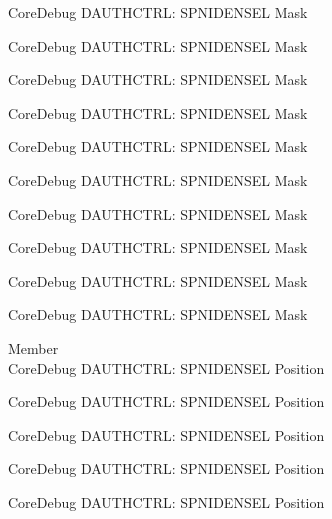 \begin{DoxyRefList}
\label{deprecated__deprecated000539}%
%
Core\+Debug DAUTHCTRL\+: SPNIDENSEL Mask 

\label{deprecated__deprecated000641}%
%
Core\+Debug DAUTHCTRL\+: SPNIDENSEL Mask 

\label{deprecated__deprecated000747}%
%
Core\+Debug DAUTHCTRL\+: SPNIDENSEL Mask 

\label{deprecated__deprecated000801}%
%
Core\+Debug DAUTHCTRL\+: SPNIDENSEL Mask 

\label{deprecated__deprecated000877}%
%
Core\+Debug DAUTHCTRL\+: SPNIDENSEL Mask 

\label{deprecated__deprecated000940}%
%
Core\+Debug DAUTHCTRL\+: SPNIDENSEL Mask 

\label{deprecated__deprecated001019}%
%
Core\+Debug DAUTHCTRL\+: SPNIDENSEL Mask 

\label{deprecated__deprecated001095}%
%
Core\+Debug DAUTHCTRL\+: SPNIDENSEL Mask 

\label{deprecated__deprecated001198}%
%
Core\+Debug DAUTHCTRL\+: SPNIDENSEL Mask 

\label{deprecated__deprecated001300}%
%
Core\+Debug DAUTHCTRL\+: SPNIDENSEL Mask  
\item[Member \doxylink{group___c_m_s_i_s___s_c_b_ga866734a8e4bec2d6cf091e265c6c0f3d}{Core\+Debug\+\_\+\+DAUTHCTRL\+\_\+\+SPNIDENSEL\+\_\+\+Pos} ]\hfill \\
\label{deprecated__deprecated000087}%
%
Core\+Debug DAUTHCTRL\+: SPNIDENSEL Position 

\label{deprecated__deprecated000141}%
%
Core\+Debug DAUTHCTRL\+: SPNIDENSEL Position 

\label{deprecated__deprecated000217}%
%
Core\+Debug DAUTHCTRL\+: SPNIDENSEL Position 

\label{deprecated__deprecated000280}%
%
Core\+Debug DAUTHCTRL\+: SPNIDENSEL Position 

\label{deprecated__deprecated000359}%
%
Core\+Debug DAUTHCTRL\+: SPNIDENSEL Position 


\end{DoxyRefList}

